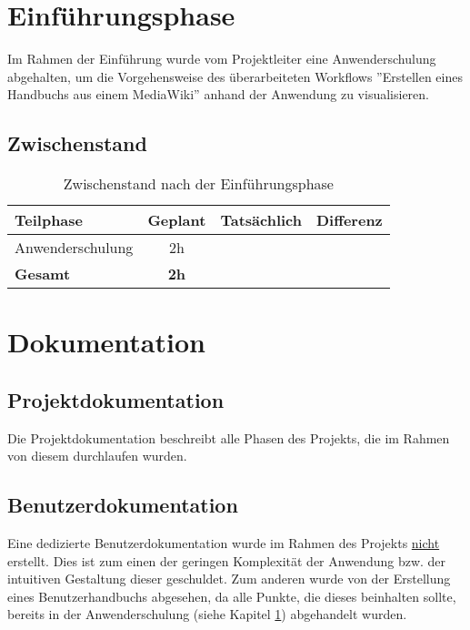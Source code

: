 \documentclass[12pt, xcolor=dvipsnames]{scrartcl}
\begin{document}
\section{Einführungsphase} \label{sec:einfuehrung}
Im Rahmen der Einführung wurde vom Projektleiter eine Anwenderschulung abgehalten, um die Vorgehensweise des überarbeiteten Workflows ''Erstellen eines Handbuchs aus einem MediaWiki'' anhand der Anwendung zu visualisieren.

\subsection{Zwischenstand}

\begin{table}[H]
	\centering
	\begin{tabular}{lccc}

		\rowcolor{white!15}				
		\textbf{Teilphase} & \textbf{Geplant} & \textbf{Tatsächlich} & \textbf{Differenz} \\\hline		
		
		\rowcolor{gray!15}
		Anwenderschulung & 2h & \timeEinfuehrung & \timeEinfuehrungDiff \\\hline    	    	    

		\rowcolor{white!15}				
		\textbf{Gesamt} & \textbf{2h} & \textbf{\timeEinfuehrung} & \textbf{\timeEinfuehrungDiff} \\			

	    
	\end{tabular}
	\caption{Zwischenstand nach der Einführungsphase}
	\label{tab:zwischenstand_einfuehrungsphase}
\end{table}

\section{Dokumentation}

\subsection{Projektdokumentation}

Die Projektdokumentation beschreibt alle Phasen des Projekts, die im Rahmen von diesem durchlaufen wurden.

\subsection{Benutzerdokumentation}

Eine dedizierte Benutzerdokumentation wurde im Rahmen des Projekts \underline{nicht} erstellt. Dies ist zum einen der geringen Komplexität der Anwendung bzw. der intuitiven Gestaltung dieser geschuldet. Zum anderen wurde von der Erstellung eines Benutzerhandbuchs abgesehen, da alle Punkte, die dieses beinhalten sollte, bereits in der Anwenderschulung (siehe Kapitel \ref{sec:einfuehrung}) abgehandelt wurden.
\end{document}
